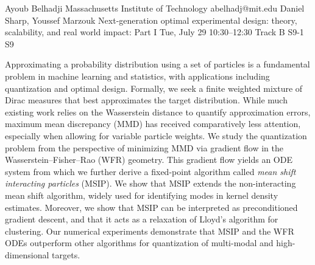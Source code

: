 \begin{talk}
  {Ayoub Belhadji}%
  {Massachusetts Institute of Technology}%
  {abelhadj@mit.edu}%
  {Daniel Sharp, Youssef Marzouk}%
  {Next-generation optimal experimental design: theory, scalability, and real world impact: Part I}%
  {}%
  {Tue, July 29 10:30–12:30 Track B}%
  {S9-1}%
  {S9}%
				
			
Approximating a probability distribution using a set of particles is a fundamental problem in machine learning and statistics, with applications including  quantization and optimal design. Formally, we seek a finite weighted mixture of Dirac measures that best approximates the target distribution. While much existing work relies on the Wasserstein distance to quantify approximation errors, maximum mean discrepancy (MMD) has received comparatively less attention, especially when allowing for variable particle weights. We study the quantization problem from the perspective of minimizing MMD via gradient flow in the Wasserstein--Fisher--Rao (WFR) geometry. This gradient flow yields an ODE system from which we further derive a fixed-point algorithm called \emph{mean shift interacting particles} (MSIP). We show that MSIP extends the non-interacting mean shift algorithm, widely used for identifying modes in kernel density estimates. Moreover, we show that MSIP can be interpreted as preconditioned gradient descent, and that it acts as a relaxation of Lloyd's algorithm for clustering. 
Our numerical experiments demonstrate that MSIP and the WFR ODEs outperform other algorithms for quantization of multi-modal and high-dimensional targets.
\medskip


\end{talk}

